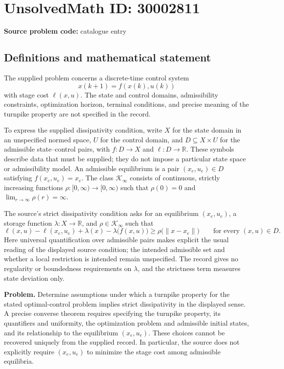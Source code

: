 \documentclass[11pt]{article}
\newcommand{\R}{\mathbb{R}}
\begin{document}
\section*{UnsolvedMath ID: 30002811}
\textbf{Source problem code:} catalogue entry
\subsection{Definitions and mathematical statement}
The supplied problem concerns a discrete-time control system
\[
 x(k+1)=f(x(k),u(k))
\]
with stage cost \(\ell(x,u)\). The state and control domains, admissibility constraints, optimization horizon, terminal conditions, and precise meaning of the turnpike property are not specified in the record.

To express the supplied dissipativity condition, write \(X\) for the state domain in an unspecified normed space, \(U\) for the control domain, and \(D\subseteq X\times U\) for the admissible state--control pairs, with \(f:D\to X\) and \(\ell:D\to\R\). These symbols describe data that must be supplied; they do not impose a particular state space or admissibility model. An admissible equilibrium is a pair \((x_e,u_e)\in D\) satisfying \(f(x_e,u_e)=x_e\). The class \(\mathcal K_\infty\) consists of continuous, strictly increasing functions \(\rho:[0,\infty)\to[0,\infty)\) such that \(\rho(0)=0\) and \(\lim_{r\to\infty}\rho(r)=\infty\).

The source's strict dissipativity condition asks for an equilibrium \((x_e,u_e)\), a storage function \(\lambda:X\to\R\), and \(\rho\in\mathcal K_\infty\) such that
\[
 \ell(x,u)-\ell(x_e,u_e)
 +\lambda(x)-\lambda\bigl(f(x,u)\bigr)
 \geq \rho\bigl(\lVert x-x_e\rVert\bigr)
 \qquad\text{for every }(x,u)\in D.
\]
Here universal quantification over admissible pairs makes explicit the usual reading of the displayed source condition; the intended admissible set and whether a local restriction is intended remain unspecified. The record gives no regularity or boundedness requirements on \(\lambda\), and the strictness term measures state deviation only.

\textbf{Problem.} Determine assumptions under which a turnpike property for the stated optimal-control problem implies strict dissipativity in the displayed sense. A precise converse theorem requires specifying the turnpike property, its quantifiers and uniformity, the optimization problem and admissible initial states, and its relationship to the equilibrium \((x_e,u_e)\). These choices cannot be recovered uniquely from the supplied record. In particular, the source does not explicitly require \((x_e,u_e)\) to minimize the stage cost among admissible equilibria.
\end{document}
